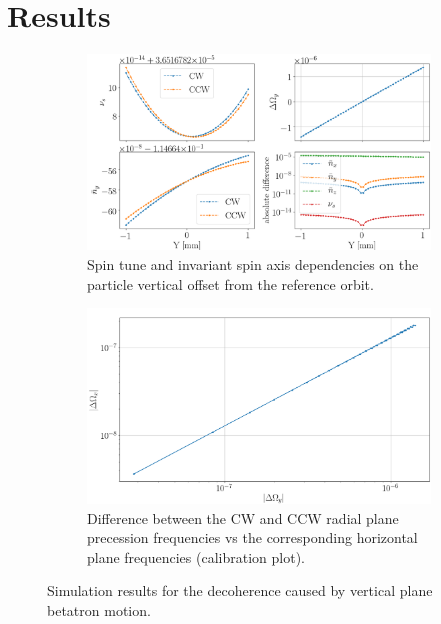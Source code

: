 \documentclass[a4paper]{jacow}
\begin{document}
\section{Results}

\begin{figure}[h]
  \centering
  \begin{subfigure}{\linewidth}\centering
    \includegraphics[width=\linewidth]{../img/IPAC19/GFF_stune_range_Y}
    \caption{Spin tune and invariant spin axis dependencies on the particle vertical offset
      from the reference orbit.\label{fig:Y:calib_plot:stune}}
  \end{subfigure}
  \begin{subfigure}{\linewidth}\centering
    \includegraphics[width=\linewidth]{../img/IPAC19/GFF_omegas_range_Y}
    \caption{Difference between the CW and CCW radial plane precession frequencies
      vs the corresponding horizontal plane frequencies (calibration plot).\label{fig:Y:calib_plot:omegas}}
  \end{subfigure}
  \caption{Simulation results for the decoherence caused by
    vertical plane betatron motion.\label{fig:Y:calib_plot}}
\end{figure}
\end{document}
